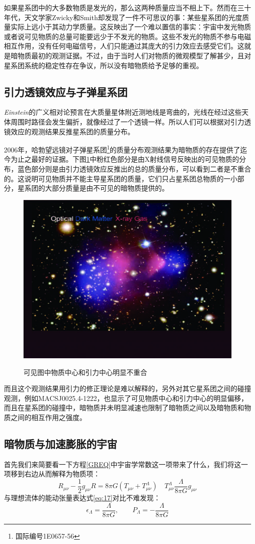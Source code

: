 \documentclass{ctexart}
\begin{document}
	如果星系团中的大多数物质是发光的，那么这两种质量应当不相上下。然而在三十年代，天文学家Zwicky和Smith却发现了一件不可思议的事：某些星系团的光度质量实际上远小于其动力学质量。这反映出了一个难以置信的事实：宇宙中发光物质或者说可见物质的总量可能要远少于不发光的物质。这些不发光的物质不参与电磁相互作用，没有任何电磁信号，人们只能通过其庞大的引力效应去感受它们。这就是暗物质最初的观测证据。不过，由于当时人们对物质的微观模型了解甚少，且对星系团系统的稳定性存在争议，所以没有暗物质给予足够的重视。
	
	\subsection{引力透镜效应与子弹星系团}
	\textit{Einstein}的广义相对论预言在大质量星体附近测地线是弯曲的，光线在经过这些天体周围时路径会发生偏折，就像经过了一个透镜一样。所以人们可以根据对引力透镜效应的观测结果反推星系团的质量分布。
	
	2006年，哈勃望远镜对子弹星系团\footnote{国际编号1E0657-56}的质量分布观测结果为暗物质的存在提供了迄今为止之最好的证据\cite{Clowe_2006}。下图\ref{fig:5}中粉红色部分是由X射线信号反映出的可见物质的分布，蓝色部分则是由引力透镜效应反推出的总的质量分布，可以看到二者是不重合的。这说明可见物质并不能主导星系团的质量，它们只占星系团总物质的一小部分，星系团的大部分质量是由不可见的暗物质提供的。
	\begin{figure}[h]
		\centering
		\includegraphics[width=.6\linewidth]{figs/fig5.jpg}
		\label{fig:5}
		\caption[]{可见图中物质中心和引力中心明显不重合}
	\end{figure}
	而且这个观测结果用引力的修正理论是难以解释的，另外对其它星系团之间的碰撞观测，例如MACSJ0025.4-1222\cite{Brada2008RevealingTP}，也显示了可见物质中心和引力中心的明显偏移，而且在星系团的碰撞中，暗物质并未明显减速也限制了暗物质之间以及暗物质和物质之间的相互作用之强度。
	
	\subsection{暗物质与加速膨胀的宇宙}
	首先我们来简要看一下方程\ref{GREQ}中宇宙学常数这一项带来了什么，我们将这一项移到右边从而解释为物质项：
	\begin{equation}
		R_{\mu\nu}-\frac{1}{2}g_{\mu\nu}R=8\pi G\left(T_{\mu\nu}+T_{\mu\nu}^\Lambda\right)\quad T_{\mu\nu}^\Lambda\frac{\Lambda}{8\pi G}g_{\mu\nu}
	\end{equation}
	与理想流体的能动张量表达式\ref{eq:17}对比不难发现：
	\begin{equation}
		\epsilon_\Lambda=\frac{\Lambda}{8\pi G},\qquad P_\Lambda=-\frac{\Lambda}{8\pi G} 
	\end{equation}
\end{document}
